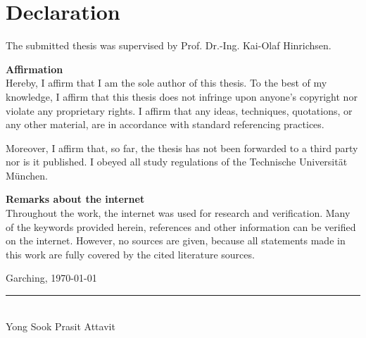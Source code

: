 \chapter*{Declaration}
\label{cap:Erklaerung}
\thispagestyle{plain}
%
The submitted thesis was supervised by Prof. Dr.-Ing. Kai-Olaf Hinrichsen.
\vspace{0.5cm}

\textbf{Affirmation}\\
Hereby, I affirm that I am the sole author of this thesis. To the best of my knowledge, I affirm
that this thesis does not infringe upon anyone's copyright nor violate any proprietary rights.
I affirm that any ideas, techniques, quotations, or any other material, are in accordance with
standard referencing practices.

Moreover, I affirm that, so far, the thesis has not been forwarded to a third party nor is it published.
I obeyed all study regulations of the Technische Universität München.

\vspace{0.5cm}

\textbf{Remarks about the internet}\\
Throughout the work, the internet was used for research and verification. Many of the
keywords provided herein, references and other information can be verified on the internet.
However, no sources are given, because all statements made in this work are fully covered by
the cited literature sources.

\vspace*{1.5cm}
\hspace*{1cm} Garching, \today	%
\hspace*{3cm}\rule[-3pt]{5cm}{1pt}\\
\hspace*{9.3cm} Yong Sook Prasit Attavit
%
\cleardoublepage
